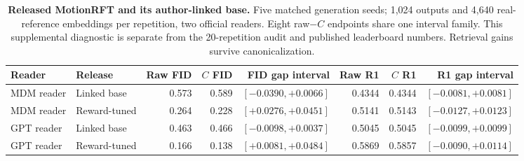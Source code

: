 \begin{table}[t]
\centering\footnotesize
\caption{\textbf{Released MotionRFT and its author-linked base.} Five matched generation seeds; 1,024 outputs and 4,640 real-reference embeddings per repetition, two official readers. Eight raw$-C$ endpoints share one interval family. This supplemental diagnostic is separate from the 20-repetition audit and published leaderboard numbers. Retrieval gains survive canonicalization.}
\label{tab:rewardrelease}
\begin{tabular}{llrrrrrr}\toprule
Reader&Release&Raw FID&$C$ FID&FID gap interval&Raw R1&$C$ R1&R1 gap interval\\\midrule
MDM reader&Linked base&0.573&0.589&$[-0.0390,+0.0066]$&0.4344&0.4344&$[-0.0081,+0.0081]$\\
MDM reader&Reward-tuned&0.264&0.228&$[+0.0276,+0.0451]$&0.5141&0.5143&$[-0.0127,+0.0123]$\\
GPT reader&Linked base&0.463&0.466&$[-0.0098,+0.0037]$&0.5045&0.5045&$[-0.0099,+0.0099]$\\
GPT reader&Reward-tuned&0.166&0.138&$[+0.0081,+0.0484]$&0.5869&0.5857&$[-0.0090,+0.0114]$\\
\bottomrule\end{tabular}\end{table}
